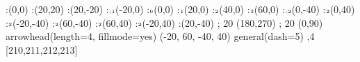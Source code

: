 \begin{parts}
  \begin{solution}
  \end{solution}  
      :(0,0)
      :(20,20)%
      :(20,-20)%
      \def\Xmax{60}
      \def\Ymax{40}
      \def\Xmin{-20}
      \def\Ymin{-40}
      :$\tiny\text{-1}$(\Xmin,0)
      :$\tiny\text{0}$(0,0)
      :$\tiny\text{1}$(20,0)
      :$\tiny\text{2}$(40,0)
      :$\tiny\text{3}$(\Xmax,0)
      :$\tiny\text{-2}$(0,\Ymin)
      :$\tiny\text{2}$(0,\Ymax)
      :$\tiny\text{2}$(\Xmin,\Ymin)
      :$\tiny\text{2}$(\Xmax,\Ymin)
      :$\tiny\text{2}$(\Xmax,\Ymax)
      :$\tiny\text{2}$(\Xmin,\Ymax)
      :(20,\Ymin) %
    \figdrawbegin{}
\ifprintanswers
       ; 20 (180,270)
       ; 20 (0,90)
\fi  
      \figset arrowhead(length=4, fillmode=yes)
      (\Xmin, \Xmax, \Ymin, \Ymax)
      \figset general(dash=5)
      ,4 [210,211,212,213]
    \figdrawend
    \centerline{\box\figBoxA}

\end{parts}
